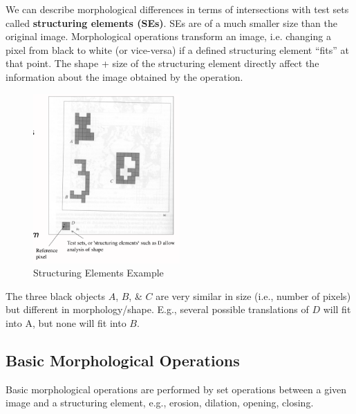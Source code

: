 \documentclass[a4paper,11pt]{article}
\begin{document}
We can describe morphological differences in terms of intersections with test sets called \textbf{structuring elements (SEs)}.
SEs are of a much smaller size than the original image.
Morphological operations transform an image, i.e. changing a pixel from black to white (or vice-versa) if a defined structuring element ``fits'' at that point.
The shape + size of the structuring element directly affect the information about the image obtained by the operation.

\begin{tcolorbox}[colback=gray!10, colframe=black, title=\textbf{Structuring Elements Example}]
\begin{figure}[H]
    \centering
    \includegraphics[width=0.5\textwidth]{images/seexample.png}
    \caption{Structuring Elements Example}
\end{figure}

The three black objects $A$, $B$, \& $C$ are very similar in size (i.e., number of pixels) but different in morphology/shape.
E.g., several possible translations of $D$ will fit into A, but none will fit into $B$.
\end{tcolorbox}

\subsection{Basic Morphological Operations}
Basic morphological operations are performed by set operations between a given image and a structuring element, e.g., erosion, dilation, opening, closing.
\end{document}
